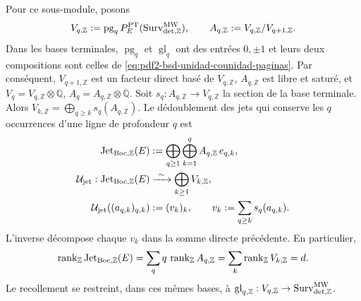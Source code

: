 Pour ce sous-module, posons
\begin{equation}\label{eq:pdf2-bsd-redes-paginas-saturadas}
 V_{q,\mathbb Z}:=\operatorname{pg}_qP_E^{\rm PT}
   (\operatorname{Surv}_{{\rm det},\mathbb Z}^{\rm MW}),
 \qquad
 A_{q,\mathbb Z}:=V_{q,\mathbb Z}/V_{q+1,\mathbb Z}.
\end{equation}
Dans les bases terminales, $\operatorname{pg}_q$ et
$\operatorname{gl}_q$ ont des entrées $0,\pm1$ et leurs deux compositions sont
celles de \eqref{eq:pdf2-bsd-unidad-counidad-paginas}. Par conséquent,
$V_{q+1,\mathbb Z}$ est un facteur direct basé de $V_{q,\mathbb Z}$,
$A_{q,\mathbb Z}$ est libre et saturé, et
$V_q=V_{q,\mathbb Z}\otimes\mathbb Q$,
$A_q=A_{q,\mathbb Z}\otimes\mathbb Q$.
Soit $s_q:A_{q,\mathbb Z}\to V_{q,\mathbb Z}$ la section de la base
terminale. Alors
$V_{k,\mathbb Z}=\bigoplus_{q\geq k}s_q(A_{q,\mathbb Z})$. Le dédoublement
des jets qui conserve les $q$ occurrences d'une ligne de profondeur $q$ est
\begin{equation}\label{eq:pdf2-bsd-desdoblamiento-jets}
 \begin{aligned}
 \operatorname{Jet}_{\rm Boc,\mathbb Z}(E)
   &:=\bigoplus_{q\geq1}\bigoplus_{k=1}^{q}
       A_{q,\mathbb Z}\,e_{q,k},\\
 \mathcal U_{\rm jet}:
 \operatorname{Jet}_{\rm Boc,\mathbb Z}(E)
   &\xrightarrow{\ \sim\ }
     \bigoplus_{k\geq1}V_{k,\mathbb Z},\\
 \mathcal U_{\rm jet}((a_{q,k})_{q,k})
   &:=(v_k)_k,
   \qquad v_k:=\sum_{q\geq k}s_q(a_{q,k}).
 \end{aligned}
\end{equation}
L'inverse décompose chaque $v_k$ dans la somme directe précédente. En particulier,
\begin{equation}\label{eq:pdf2-bsd-dimension-jet}
 \operatorname{rank}_{\mathbb Z}\operatorname{Jet}_{\rm Boc,\mathbb Z}(E)
 =\sum_q q\,\operatorname{rank}_{\mathbb Z}A_{q,\mathbb Z}
 =\sum_k\operatorname{rank}_{\mathbb Z}V_{k,\mathbb Z}=d.
\end{equation}
Le recollement se restreint, dans ces mêmes bases, à
$\operatorname{gl}_{q,\mathbb Z}:V_{q,\mathbb Z}\to
\operatorname{Surv}_{{\rm det},\mathbb Z}^{\rm MW}$.

